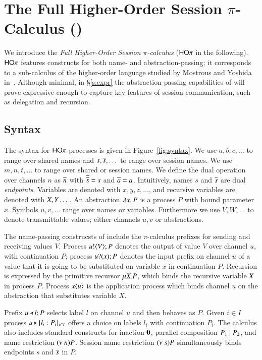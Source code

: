 
\section{The Full Higher-Order Session $\pi$-Calculus (\HOp)}
\label{sec:calculus}

We introduce the {\em Full Higher-Order Session $\pi$-calculus}
($\mathsf{HO}\pi$ in the following).
$\mathsf{HO}\pi$ features constructs for both name- and abstraction-passing;
it corresponds to a sub-calculus 
of the higher-order language studied by Mostrous and Yoshida in~\cite{tlca07}.
Although minimal, in \S\ref{s:expr}
the abstraction-passing capabilities of \HOp will prove 
expressive enough to capture key features of session communication, 
such as delegation and recursion.

\subsection{Syntax}

The syntax for $\mathsf{HO}\pi$ processes is given in Figure~\ref{fig:syntax}.
We use $a,b,c, \dots$ to range over shared names and
$s, \overline{s}, \dots$ to range over session names.
We use $m, n, t, \dots$ to range over shared or session names.
We define the dual operation over channels $n$ as $\overline{n}$ with
$\overline{\overline{s}} = s$ and $\overline{a} = a$.
Intuitively, names $s$ and $\overline{s}$ are dual \emph{endpoints}.
Variables are denoted with $x, y, z, \dots$, 
and recursive variables are denoted with $X, Y \dots$.
An abstraction $\lambda x.\,P$ is a process $P$ with bound parameter $x$.
Symbols $u, v, \dots$ range over names or variables. Furthermore
we use $V, W, \dots$ to denote transmittable values; either channels $u, v$ or
abstractions.

The name-passing construcsts of \HOp include the
$\pi$-calculus prefixes for sending and receiving values $V$.
Process $u ! \langle V \rangle ; P$ denotes the output of value $V$
over channel $u$, with continuation $P$;
process $u ? (x) ; P$ denotes the input prefix on channel $u$ of a value
that it is going to be substituted on variable $x$ in continuation $P$. 
Recursion is expressed by the primitive recursor $\mu X. P$,
which binds the recursive variable $X$ in process $P$.
Process $x\langle u \rangle$ is the application
process which binds channel $u$ on the abstraction that
substitutes variable $X$.

Prefix $u \triangleleft l ; P$ selects label $l$ on channel $u$ and then behaves as $P$.
Given $i \in I$ process $u \triangleright \{l_i: P_i\}_{i \in I}$ offers a choice on labels $l_i$ with
continuation $P_i$.
The calculus also includes standard constructs for 
inaction $\mathbf{0}$,  parallel composition $P_1 \;|\; P_2$, and 
name restriction $(\nu\ n) P$.
Session name restriction $(\nu\ s) P$ simultaneously binds endpoints $s$ and $\overline{s}$ in $P$.

